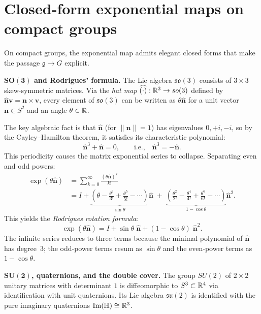 \section{Closed-form exponential maps on compact groups}\label{sec:compact}

On compact groups, the exponential map admits elegant closed forms that make the passage $\mathfrak{g} \to G$ explicit.

\medskip\noindent\textbf{$\boldsymbol{SO(3)}$ and Rodrigues' formula.}
The Lie algebra $\mathfrak{so}(3)$ consists of $3 \times 3$ skew-symmetric matrices. Via the \emph{hat map} $\widehat{(\cdot)} : \mathbb{R}^3 \to so(3)$ defined by $\hat{\mathbf{n}}\mathbf{v} = \mathbf{n} \times \mathbf{v}$, every element of $\mathfrak{so}(3)$ can be written as $\theta\hat{\mathbf{n}}$ for a unit vector $\mathbf{n} \in S^2$ and an angle $\theta \in \mathbb{R}$.

The key algebraic fact is that $\hat{\mathbf{n}}$ (for $\|\mathbf{n}\| = 1$) has eigenvalues $0, +i, -i$, so by the Cayley--Hamilton theorem, it satisfies its characteristic polynomial:
\begin{equation}\label{eq:cayley-hamilton-so3}
\hat{\mathbf{n}}^3 + \hat{\mathbf{n}} = 0, \qquad\text{i.e.,}\quad \hat{\mathbf{n}}^3 = -\hat{\mathbf{n}}.
\end{equation}
This periodicity causes the matrix exponential series to collapse. Separating even and odd powers:
\begin{align*}
\exp(\theta\hat{\mathbf{n}})
&= \sum_{k=0}^{\infty} \frac{(\theta\hat{\mathbf{n}})^k}{k!} \\
&= I + \underbrace{\left(\theta - \frac{\theta^3}{3!} + \frac{\theta^5}{5!} - \cdots\right)}_{\displaystyle\sin\theta}\hat{\mathbf{n}} \;+\; \underbrace{\left(\frac{\theta^2}{2!} - \frac{\theta^4}{4!} + \frac{\theta^6}{6!} - \cdots\right)}_{\displaystyle 1 - \cos\theta}\hat{\mathbf{n}}^2.
\end{align*}
This yields the \emph{Rodrigues rotation formula}:
\begin{equation}\label{eq:rodrigues}
\exp(\theta\hat{\mathbf{n}}) = I + \sin\theta\;\hat{\mathbf{n}} + (1 - \cos\theta)\;\hat{\mathbf{n}}^2.
\end{equation}
The infinite series reduces to three terms because the minimal polynomial of $\hat{\mathbf{n}}$ has degree~3; the odd-power terms resum as $\sin\theta$ and the even-power terms as $1 - \cos\theta$.

\medskip\noindent\textbf{$\boldsymbol{SU(2)}$, quaternions, and the double cover.}
The group $SU(2)$ of $2 \times 2$ unitary matrices with determinant $1$ is diffeomorphic to $S^3 \subset \mathbb{R}^4$ via identification with unit quaternions. Its Lie algebra $\mathfrak{su}(2)$ is identified with the pure imaginary quaternions $\operatorname{Im}(\mathbb{H}) \cong \mathbb{R}^3$.

